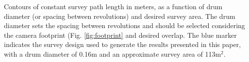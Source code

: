 \label{fig:survey_length} Contours of constant survey path length in meters, as a function of drum diameter (or spacing between revolutions) and desired survey area. The drum diameter sets the spacing between revolutions and should be selected considering the camera footprint (Fig. \ref{fig:footprint} and desired overlap. The blue marker indicates the survey design used to generate the results presented in this paper, with a drum diameter of 0.16m and an approximate survey area of 113m$^2$.